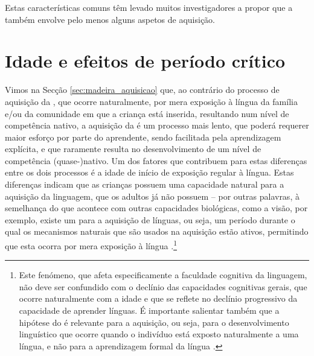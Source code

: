 \documentclass[output=paper]{LSP/langsci}
\begin{document}
Estas características comuns têm levado muitos investigadores a propor que a  também envolve pelo menos alguns aspetos de aquisição. 
\section{Idade e efeitos de período crítico}
\label{sec:madeira_periodo_critico}
Vimos na Secção \ref{sec:madeira_aquisicao} que, ao contrário do processo de aquisição da , que ocorre naturalmente, por mera exposição à língua da família e/ou da comunidade em que a criança está inserida, resultando num nível de competência nativo, a aquisição da  é um processo mais lento, que poderá requerer maior esforço por parte do aprendente, sendo facilitada pela aprendizagem explícita, e que raramente resulta no desenvolvimento de um nível de competência (quase-)nativo. Um dos fatores que contribuem para estas diferenças entre os dois processos é a idade de início de exposição regular à língua. Estas diferenças indicam que as crianças possuem uma capacidade natural para a aquisição da linguagem, que os adultos já não possuem – por outras palavras, à semelhança do que acontece com outras capacidades biológicas, como a visão, por exemplo, existe um  para a aquisição de línguas, ou seja, um período durante o qual os mecanismos naturais que são usados na aquisição estão ativos, permitindo que esta ocorra por mera exposição à língua \citep{lenneberg1967}.\footnote{Este fenómeno, que afeta especificamente a faculdade cognitiva da linguagem, não deve ser confundido com o declínio das capacidades cognitivas gerais, que ocorre naturalmente com a idade e que se reflete no declínio progressivo da capacidade de aprender línguas. É importante salientar também que a hipótese do  é relevante para a aquisição, ou seja, para o desenvolvimento linguístico que ocorre quando o indivíduo está exposto naturalmente a uma língua, e não para a aprendizagem formal da língua \citep{krashen1981}.}
\end{document}
